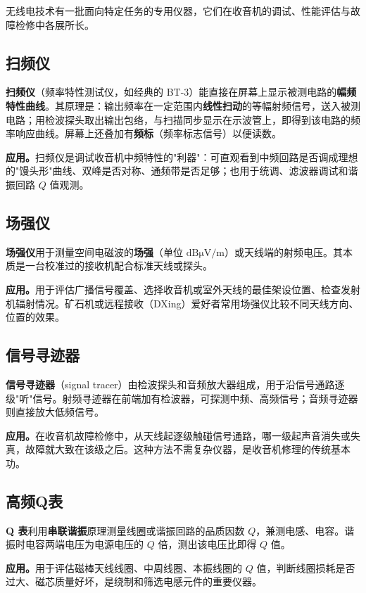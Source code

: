 \documentclass[12pt,UTF8]{ctexbook}
\begin{document}
无线电技术有一批面向特定任务的专用仪器，它们在收音机的调试、性能评估与故障检修中各展所长。

\subsection{扫频仪}

\textbf{扫频仪}（频率特性测试仪，如经典的 BT-3）能直接在屏幕上显示被测电路的\textbf{幅频特性曲线}。其原理是：输出频率在一定范围内\textbf{线性扫动}的等幅射频信号，送入被测电路；用检波探头取出输出包络，与扫描同步显示在示波管上，即得到该电路的频率响应曲线。屏幕上还叠加有\textbf{频标}（频率标志信号）以便读数。

\textbf{应用。}扫频仪是调试收音机中频特性的"利器"：可直观看到中频回路是否调成理想的"馒头形"曲线、双峰是否对称、通频带是否足够；也用于统调、滤波器调试和谐振回路 $Q$ 值观测。

\subsection{场强仪}

\textbf{场强仪}用于测量空间电磁波的\textbf{场强}（单位 $\mathrm{dB\mu V/m}$）或天线端的射频电压。其本质是一台校准过的接收机配合标准天线或探头。

\textbf{应用。}用于评估广播信号覆盖、选择收音机或室外天线的最佳架设位置、检查发射机辐射情况。矿石机或远程接收（DXing）爱好者常用场强仪比较不同天线方向、位置的效果。

\subsection{信号寻迹器}

\textbf{信号寻迹器}（signal tracer）由检波探头和音频放大器组成，用于沿信号通路逐级"听"信号。射频寻迹器在前端加有检波器，可探测中频、高频信号；音频寻迹器则直接放大低频信号。

\textbf{应用。}在收音机故障检修中，从天线起逐级触碰信号通路，哪一级起声音消失或失真，故障就大致在该级之后。这种方法不需复杂仪器，是收音机修理的传统基本功。

\subsection{高频Q表}

\textbf{Q 表}利用\textbf{串联谐振}原理测量线圈或谐振回路的品质因数 $Q$，兼测电感、电容。谐振时电容两端电压为电源电压的 $Q$ 倍，测出该电压比即得 $Q$ 值。

\textbf{应用。}用于评估磁棒天线线圈、中周线圈、本振线圈的 $Q$ 值，判断线圈损耗是否过大、磁芯质量好坏，是绕制和筛选电感元件的重要仪器。
\end{document}
